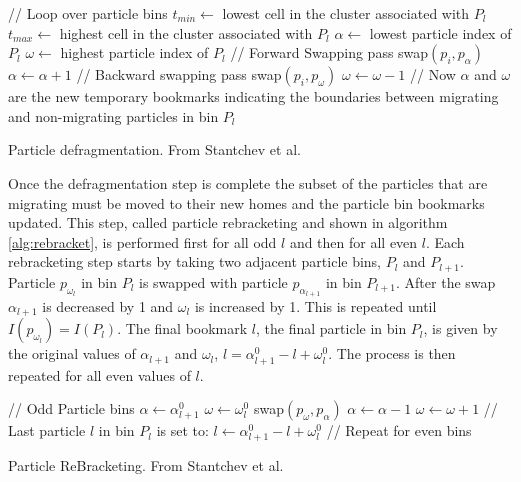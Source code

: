 \begin{algorithm}
	\begin{algorithmic}
		\STATE // Loop over particle bins
			\STATE $t_{min} \leftarrow$ lowest cell in the cluster associated with $P_l$
			\STATE $t_{max} \leftarrow$ highest cell in the cluster associated with $P_l$
			\STATE $\alpha \leftarrow$ lowest particle index of  $P_l$
			\STATE $\omega \leftarrow$ highest particle index of $P_l$
			\STATE // Forward Swapping pass 
					\STATE swap$(p_i, p_{\alpha})$
					\STATE $\alpha \leftarrow \alpha + 1$
				\ENDIF			
			\ENDFOR
			\STATE // Backward swapping pass
					\STATE swap$(p_i, p_{\omega})$
					\STATE $\omega \leftarrow \omega - 1$
				\ENDIF			
			\ENDFOR
			\STATE // Now $\alpha$ and $\omega$ are the new temporary bookmarks indicating the boundaries between migrating and non-migrating particles in bin $P_l$
		\ENDFOR
	\end{algorithmic}
	\caption[Particle defragmentation]{Particle defragmentation. From Stantchev et al. \cite{Stantchev2008}}
	\label{alg:defrag}
\end{algorithm}


 Once the defragmentation step is complete the subset of the particles that are migrating must be moved to their new homes and the particle bin bookmarks updated. This step, called particle rebracketing and shown in algorithm \ref{alg:rebracket}, is performed first for all odd $l$ and then for all even $l$. Each rebracketing step starts by taking two adjacent particle bins, $P_l$ and $P_{l+1}$. Particle $p_{\omega_l}$ in bin $P_{l}$ is swapped with particle $p_{\alpha_{l+1}}$ in bin $P_{l+1}$. After the swap $\alpha_{l+1}$ is decreased by 1 and $\omega_l$ is increased by 1. This is repeated until $I(p_{\omega_l}) = I(P_l)$. The final bookmark $l$, the final particle in bin $P_l$, is given by the original values of $\alpha_{l+1}$ and $\omega_l$, $l = \alpha_{l+1}^0 - l + \omega_l^0$. The process is then repeated for all even values of $l$.

\begin{algorithm}
	\begin{algorithmic}
		\STATE // Odd Particle bins
		\FORALL{particle bin $P_l$ where $l$ is odd}
			\STATE $\alpha \leftarrow \alpha_{l+1}^0$
			\STATE $\omega \leftarrow \omega_l^0$
			\WHILE{$I(p_{\omega+1}) \ne I(P_l)$}
				\STATE swap$(p_\omega,p_\alpha)$
				\STATE $\alpha \leftarrow \alpha - 1$ 
				\STATE $\omega \leftarrow \omega + 1$ 		
			\ENDWHILE
			\STATE // Last particle $l$ in bin $P_l$ is set to:
			\STATE $l \leftarrow \alpha_{l+1}^0 - l + \omega_l^0$
		\ENDFOR
		\STATE // Repeat for even bins
	\end{algorithmic}
	\caption[Particle Re-Bracketing]{Particle ReBracketing. From Stantchev et al. \cite{Stantchev2008}}
	\label{alg:rebracket}
\end{algorithm}

